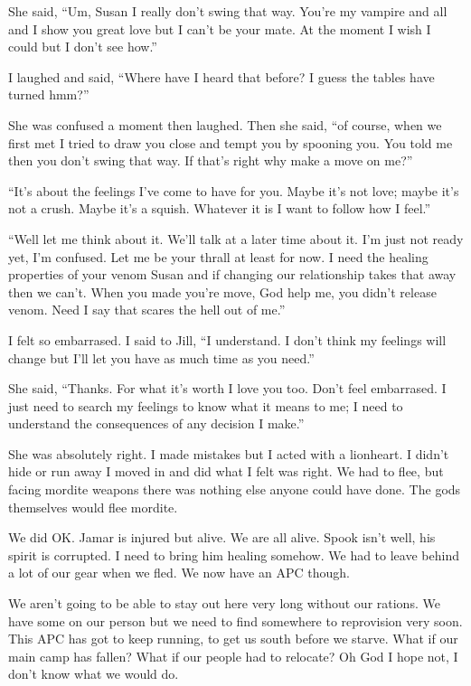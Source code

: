 She said, ``Um, Susan I really don't swing that way. You're my vampire and all and I show you great love but I can't be your mate. At the moment I wish I could but I don't see how.''

I laughed and said, ``Where have I heard that before? I guess the tables have turned hmm?''

She was confused a moment then laughed. Then she said, ``of course, when we first met I tried to draw you close and tempt you by spooning you. You told me then you don't swing that way. If that's right why make a move on me?''

``It's about the feelings I've come to have for you. Maybe it's not love; maybe it's not a crush. Maybe it's a squish. Whatever it is I want to follow how I feel.''

``Well let me think about it. We'll talk at a later time about it. I'm just not ready yet, I'm confused. Let me be your thrall at least for now. I need the healing properties of your venom Susan and if changing our relationship takes that away then we can't. When you made you're move, God help me, you didn't release venom. Need I say that scares the hell out of me.''

I felt so embarrased. I said to Jill, ``I understand. I don't think my feelings will change but I'll let you have as much time as you need.''

She said, ``Thanks. For what it's worth I love you too. Don't feel embarrased. I just need to search my feelings to know what it means to me; I need to understand the consequences of any decision I make.''

She was absolutely right. I made mistakes but I acted with a lionheart. I didn't hide or run away I moved in and did what I felt was right. We had to flee, but facing mordite weapons there was nothing else anyone could have done. The gods themselves would flee mordite.

We did OK. Jamar is injured but alive. We are all alive. Spook isn't well, his spirit is corrupted. I need to bring him healing somehow. We had to leave behind a lot of our gear when we fled. We now have an APC though.

We aren't going to be able to stay out here very long without our rations. We have some on our person but we need to find somewhere to reprovision very soon. This APC has got to keep running, to get us south before we starve. What if our main camp has fallen? What if our people had to relocate? Oh God I hope not, I don't know what we would do.

